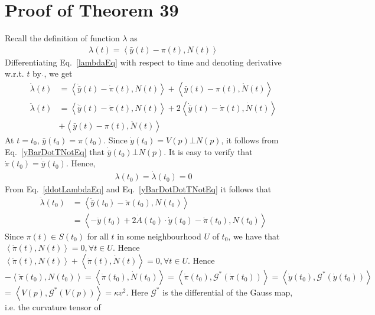 \documentclass{elsart5p}
\begin{document}
\section{Proof of Theorem 39} \label{proofthm39Sec}
Recall the definition of function $\lambda$ as 
\begin{align} \label{lambdaEq}
\lambda(t) = \left < \bar{y}(t) - \pi(t) , N(t) \right >
\end{align}
 Differentiating Eq.~\ref{lambdaEq} with respect to time and denoting derivative w.r.t. $t$ by $\dot{}$, we get
\begin{align}
  \dot{ \lambda}(t) &= \left < \dot{\bar y}(t) - \dot{\pi}(t), N(t) \right > + \left < \bar{y}(t) - \pi(t) , \dot{N}(t) \right > \\
\nonumber  \ddot{\lambda}(t) &= \left < \ddot{\bar{y}}(t) - \ddot{\pi}(t), N(t) \right > + 2\left < \dot{\bar y}(t) - \dot{\pi}(t), \dot{N}(t) \right > \\
		&+ \left < \bar{y}(t) - \pi(t), \ddot{N}(t) \right >	\label{ddotLambdaEq}
\end{align}
At $t=t_0$, $\bar{y}(t_0) = \pi(t_0)$.  Since $ \dot{y}(t_0)=V(p) \bot N(p)$, it follows from Eq.~\ref{yBarDotTNotEq}  that $\dot{\bar{y}}(t_0) \bot N(p)$.  It is easy to verify that $\dot{\pi}(t_0) = \dot{\bar{y}}(t_0)$.  Hence, 
\begin{align}
\lambda(t_0) = \dot{\lambda}(t_0) = 0 \label{lambdaTNotEq}
\end{align}
From Eq.~\ref{ddotLambdaEq} and Eq.~\ref{yBarDotDotTNotEq} it follows that
\begin{align}
\nonumber \ddot{\lambda}(t_0) &= \left < \ddot{\bar{y}}(t_0) - \ddot{\pi}(t_0), N(t_0) \right >\\
					&= \left < -\ddot{y}(t_0) + 2\dot{A}(t_0) \cdot \dot{y}(t_0) - \ddot{\pi}(t_0), N(t_0) \right >  \label{ddotLambdaTNotEq}
\end{align}
Since $\pi(t) \in S(t_0)$  for all $t$ in some neighbourhood $U$ of $t_0$, we have that $\left < \dot{\pi}(t), N(t) \right > = 0, \forall t \in U$.  
Hence $\left < \ddot{\pi}(t), N(t) \right> + \left < \dot{\pi}(t), \dot{N}(t) \right > = 0, \forall t \in U$.  
Hence $-\left < \ddot{\pi}(t_0), N(t_0) \right > =  \left< \dot{\pi}(t_0), \dot{N}(t_0) \right > =  \left< \dot{\pi}(t_0), \mathcal{G}^*(\dot{\pi}(t_0)) \right > = \left < \dot{y}(t_0), \mathcal{G}^*(\dot{y}(t_0)) \right>$ = $\left < V(p) , \mathcal{G}^*(V(p)) \right > =\kappa v^2$.  
Here $\mathcal{G}^*$ is the differential of the Gauss map, i.e. the curvature tensor of 
\end{document}
